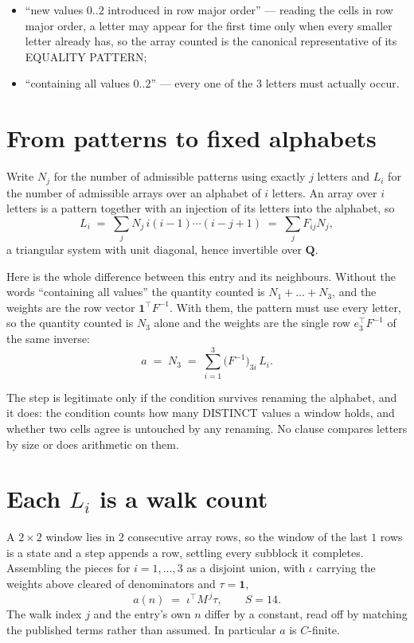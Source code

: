 \documentclass[11pt,a4paper]{article}
\theoremstyle{plain}
\theoremstyle{definition}
\begin{document}
\begin{itemize}
\item ``new values $0..2$ introduced in row major order'' --- reading the cells in row major
order, a letter may appear for the first time only when every smaller letter already has, so
the array counted is the canonical representative of its EQUALITY PATTERN;
\item ``containing all values $0..2$'' --- every one of the $3$ letters must actually
occur.
\end{itemize}


\section{From patterns to fixed alphabets}

Write $N_j$ for the number of admissible patterns using exactly $j$ letters and $L_i$ for the
number of admissible arrays over an alphabet of $i$ letters. An array over $i$ letters is a
pattern together with an injection of its letters into the alphabet, so
\[
L_i\;=\;\sum_{j} N_j\,i(i-1)\cdots(i-j+1)\;=\;\sum_j F_{ij}N_j ,
\]
a triangular system with unit diagonal, hence invertible over $\mathbf{Q}$.

Here is the whole difference between this entry and its neighbours. Without the words
``containing all values'' the quantity counted is $N_1+\dots+N_{3}$, and the weights are
the row vector $\mathbf{1}^{\!\top}F^{-1}$. With them, the pattern must use every letter,
so the quantity counted is $N_{3}$ alone and the weights are the single row
$e_{3}^{\!\top}F^{-1}$ of the same inverse:
\[
a\;=\;N_{3}\;=\;\sum_{i=1}^{3}\bigl(F^{-1}\bigr)_{3i}\,L_i .
\]

The step is legitimate only if the condition survives renaming the alphabet, and it does: the
condition counts how many DISTINCT values a window holds, and whether two cells agree is
untouched by any renaming. No clause compares letters by size or does arithmetic on them.

\section{Each $L_i$ is a walk count}

A $2\times2$ window lies in $2$ consecutive array rows, so the window of the last
$1$ rows is a state and a step appends a row, settling every subblock it completes.
Assembling the pieces for $i=1,\dots,3$ as a disjoint union, with $\iota$ carrying the
weights above cleared of denominators and $\tau=\mathbf{1}$,
\[
a(n)\;=\;\iota^{\!\top}M^{\,j}\tau ,\qquad S=14.
\]
The walk index $j$ and the entry's own $n$ differ by a constant, read off by matching the
published terms rather than assumed. In particular $a$ is $C$-finite.
\end{document}
